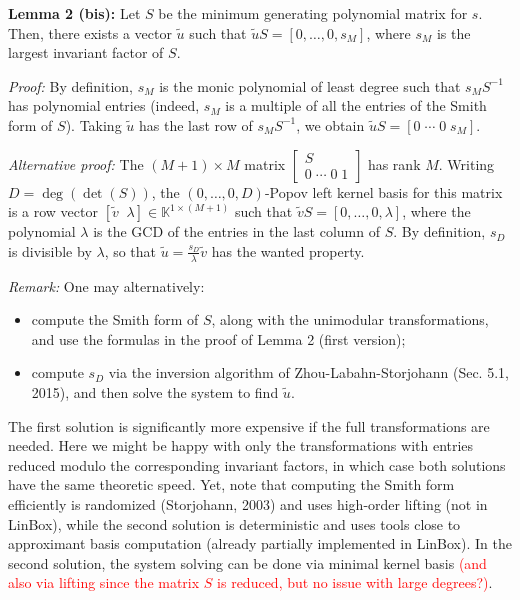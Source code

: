 \documentclass[12pt]{article}
\newcommand{\todo}[1]{\textcolor{red}{#1}}
\begin{document}
\noindent\textbf{Lemma 2 (bis):}
Let $S$ be the minimum generating polynomial matrix for $s$.  Then, there
exists a vector $\tilde{u}$ such that $\tilde{u} S = [0, \ldots, 0, s_M]$,
where $s_M$ is the largest invariant factor of $S$.

\medskip\noindent\textit{Proof:} By definition, $s_M$ is the monic polynomial
of least degree such that $s_M S^{-1}$ has polynomial entries (indeed, $s_M$ is
a multiple of all the entries of the Smith form of $S$). Taking $\tilde{u}$ has
the last row of $s_M S^{-1}$, we obtain $\tilde{u} S = [0 \; \cdots \; 0 \;
s_M]$.

\medskip\noindent\textit{Alternative proof:} The $(M+1)\times M$ matrix
$\begin{bmatrix} S \\ 0 \; \cdots \; 0 \; 1 \end{bmatrix}$ has rank $M$.
Writing $D = \deg(\det(S))$, the $(0,\ldots,0,D)$-Popov left kernel basis for
this matrix is a row vector $[\tilde{v} \;\; \lambda] \in \mathbb{K}^{1 \times
(M+1)}$ such that $\tilde{v} S = [0,\ldots,0,\lambda]$, where the polynomial
$\lambda$ is the GCD of the entries in the last column of $S$. By definition,
$s_D$ is divisible by $\lambda$, so that $\tilde{u} =
\frac{s_D}{\lambda}\tilde{v}$ has the wanted property.

\medskip\noindent\textit{Remark:}
One may alternatively:
\begin{itemize}
  \item compute the Smith form of $S$, along with the unimodular
    transformations, and use the formulas in the proof of Lemma 2 (first
    version);
  \item compute $s_D$ via the inversion algorithm of Zhou-Labahn-Storjohann
    (Sec. 5.1, 2015), and then solve the system to find $\tilde{u}$.
\end{itemize}
The first solution is significantly more expensive if the full transformations
are needed. Here we might be happy with only the transformations with entries
reduced modulo the corresponding invariant factors, in which case both
solutions have the same theoretic speed. Yet, note that computing the Smith
form efficiently is randomized (Storjohann, 2003) and uses high-order lifting
(not in LinBox), while the second solution is deterministic and uses tools
close to approximant basis computation (already partially implemented in
LinBox). In the second solution, the system solving can be done via minimal
kernel basis \todo{(and also via lifting since the matrix $S$ is reduced, but
no issue with large degrees?)}.
\end{document}
